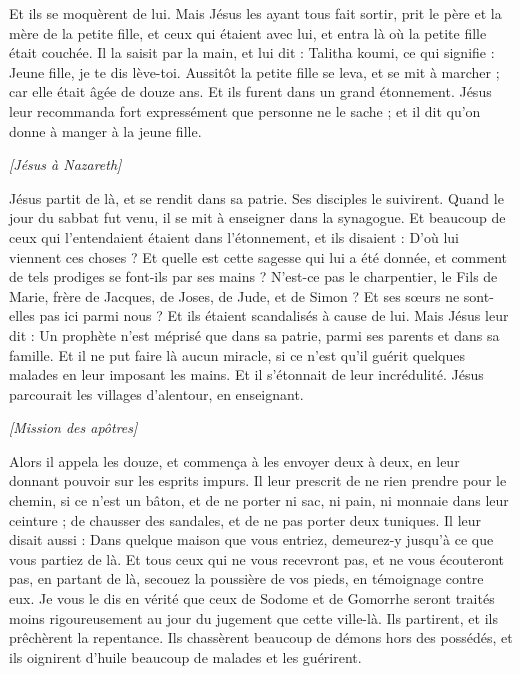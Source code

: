 \begin{multicols}{2}
Et ils se moquèrent de lui. Mais Jésus les ayant tous fait sortir, prit le père et la mère de la petite fille, et ceux qui étaient avec lui, et entra là où la petite fille était couchée.
Il la saisit par la main, et lui dit : Talitha koumi, ce qui signifie : Jeune fille, je te dis lève-toi.
Aussitôt la petite fille se leva, et se mit à marcher ; car elle était âgée de douze ans. Et ils furent dans un grand étonnement.
Jésus leur recommanda fort expressément que personne ne le sache ; et il dit qu'on donne à manger à la jeune fille.
\begin{center}
\textit{[Jésus à Nazareth]}
\end{center}
\VerseOne{}Jésus partit de là, et se rendit dans sa patrie. Ses disciples le suivirent.
Quand le jour du sabbat fut venu, il se mit à enseigner dans la synagogue. Et beaucoup de ceux qui l'entendaient étaient dans l'étonnement, et ils disaient : D'où lui viennent ces choses ? Et quelle est cette sagesse qui lui a été donnée, et comment de tels prodiges se font-ils par ses mains ?
N’est-ce pas le charpentier, le Fils de Marie, frère de Jacques, de Joses, de Jude, et de Simon ? Et ses sœurs ne sont-elles pas ici parmi nous ? Et ils étaient scandalisés à cause de lui.
Mais Jésus leur dit : Un prophète n'est méprisé que dans sa patrie, parmi ses parents et dans sa famille.
Et il ne put faire là aucun miracle, si ce n’est qu'il guérit quelques malades en leur imposant les mains.
Et il s'étonnait de leur incrédulité. Jésus parcourait les villages d'alentour, en enseignant.
\begin{center}
\textit{[Mission des apôtres]}
\end{center}
\PPE{}
Alors il appela les douze, et commença à les envoyer deux à deux, en leur donnant pouvoir sur les esprits impurs.
Il leur prescrit de ne rien prendre pour le chemin, si ce n’est un bâton, et de ne porter ni sac, ni pain, ni monnaie dans leur ceinture ;
de chausser des sandales, et de ne pas porter deux tuniques.
Il leur disait aussi : Dans quelque maison que vous entriez, demeurez-y jusqu'à ce que vous partiez de là.
Et tous ceux qui ne vous recevront pas, et ne vous écouteront pas, en partant de là, secouez la poussière de vos pieds, en témoignage contre eux. Je vous le dis en vérité que ceux de Sodome et de Gomorrhe seront traités moins rigoureusement au jour du jugement que cette ville-là.
Ils partirent, et ils prêchèrent la repentance.
Ils chassèrent beaucoup de démons hors des possédés, et ils oignirent d'huile beaucoup de malades et les guérirent.

\end{multicols}
